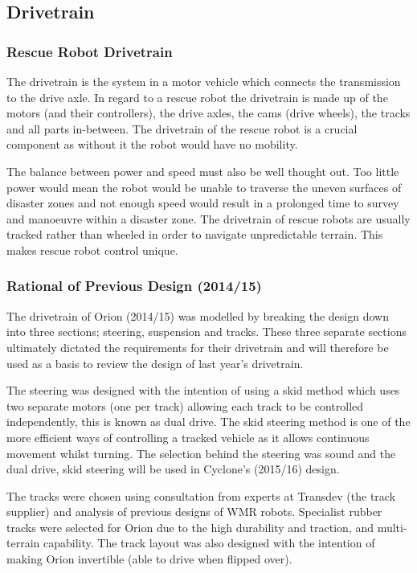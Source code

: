 \subsection{Drivetrain}
\subsubsection{Rescue Robot Drivetrain}
The drivetrain is the system in a motor vehicle which connects the transmission to the drive axle. In regard to a rescue robot the drivetrain is made up of the motors (and their controllers), the drive axles, the cams (drive wheels), the tracks and all parts in-between. The drivetrain of the rescue robot is a crucial component as without it the robot would have no mobility.\par
The balance between power and speed must also be well thought out. Too little power would mean the robot would be unable to traverse the uneven surfaces of disaster zones and not enough speed would result in a prolonged time to survey and manoeuvre within a disaster zone. The drivetrain of rescue robots are usually tracked rather than wheeled in order to navigate unpredictable terrain. This makes rescue robot control unique.

\subsubsection{Rational of Previous Design (2014/15)}
The drivetrain of Orion (2014/15) was modelled by breaking the design down into three sections; steering, suspension and tracks. These three separate sections ultimately dictated the requirements for their drivetrain and will therefore be used as a basis to review the design of last year’s drivetrain.\par

The steering was designed with the intention of using a skid method which uses two separate motors (one per track) allowing each track to be controlled independently, this is known as dual drive. The skid steering method is one of the more efficient ways of controlling a tracked vehicle as it allows continuous movement whilst turning. The selection behind the steering was sound and the dual drive, skid steering will be used in Cyclone’s (2015/16) design.\par

The tracks were chosen using consultation from experts at Transdev (the track supplier) and analysis of previous designs of WMR robots. Specialist rubber tracks were selected for Orion due to the high durability and traction, and multi-terrain capability. The track layout was also designed with the intention of making Orion invertible (able to drive when flipped over).\par

